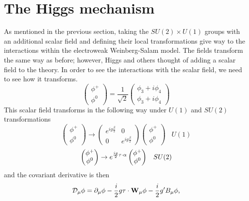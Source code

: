 \section{The Higgs mechanism}
As mentioned in the previous section, taking the $SU(2) \times U(1)$ groups with an additional scalar field and defining their local transformations give way to the interactions within the electroweak Weinberg-Salam model. The fields transform the same way as before; however, Higgs and others thought of adding a scalar field to the theory. In order to see the interactions with the scalar field, we need to see how it transforms. 
\begin{equation}\begin{pmatrix}\phi^+ \\ \phi^0\end{pmatrix} = \frac{1}{\sqrt{2}}\begin{pmatrix} \phi_3 + i\phi_4 \\ \phi_3 + i\phi_4\end{pmatrix}  \end{equation}
This scalar field transforms in the following way under $U(1)$ and $SU(2)$ transformations 
\begin{equation}\begin{pmatrix}\phi^+ \\ \phi^0\end{pmatrix} \rightarrow \begin{pmatrix} e^{ig\frac{\beta}{2}} & 0 \\ 0 & e^{ig\frac{\beta}{2}}\end{pmatrix}\begin{pmatrix}\phi^+ \\ \phi^0\end{pmatrix} \;\;\; U(1) \end{equation}
\begin{equation}\begin{pmatrix}\phi^+ \\ \phi^0\end{pmatrix} \rightarrow e^{\frac{ig}{2}\bold{\tau}\cdot\bold{\alpha}}    \begin{pmatrix}\phi^+ \\ \phi^0\end{pmatrix} \;\;\; SU(2) \end{equation}
and the covariant derivative is then 
\begin{equation}\mathcal{D}_\mu \phi = \partial_\mu \phi - \frac{i}{2}g\bold{\tau}\cdot\bold{W}_\mu \phi - \frac{i}{2}g'B_\mu\phi \text{,}\end{equation}
